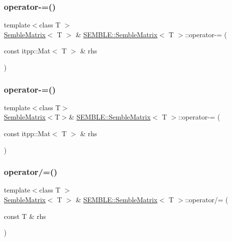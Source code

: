 \subsubsection{\texorpdfstring{operator-\/=()}{operator-=()}\hspace{0.1cm}{\footnotesize\ttfamily [3/4]}}
{\footnotesize\ttfamily template$<$class T $>$ \\
\mbox{\hyperlink{structSEMBLE_1_1SembleMatrix}{Semble\+Matrix}}$<$ T $>$ \& \mbox{\hyperlink{structSEMBLE_1_1SembleMatrix}{S\+E\+M\+B\+L\+E\+::\+Semble\+Matrix}}$<$ T $>$\+::operator-\/= (\begin{DoxyParamCaption}\item[{const itpp\+::\+Mat$<$ T $>$ \&}]{rhs }\end{DoxyParamCaption})}

\mbox{\label{structSEMBLE_1_1SembleMatrix_a51fc6327be31b88c5478f4a4418aaa92}} 
\subsubsection{\texorpdfstring{operator-\/=()}{operator-=()}\hspace{0.1cm}{\footnotesize\ttfamily [4/4]}}
{\footnotesize\ttfamily template$<$class T$>$ \\
\mbox{\hyperlink{structSEMBLE_1_1SembleMatrix}{Semble\+Matrix}}$<$T$>$\& \mbox{\hyperlink{structSEMBLE_1_1SembleMatrix}{S\+E\+M\+B\+L\+E\+::\+Semble\+Matrix}}$<$ T $>$\+::operator-\/= (\begin{DoxyParamCaption}\item[{const itpp\+::\+Mat$<$ T $>$ \&}]{rhs }\end{DoxyParamCaption})}

\mbox{\label{structSEMBLE_1_1SembleMatrix_a372ea71e90cececd03d22b6ac2076ff5}} 
\subsubsection{\texorpdfstring{operator/=()}{operator/=()}\hspace{0.1cm}{\footnotesize\ttfamily [1/6]}}
{\footnotesize\ttfamily template$<$class T $>$ \\
\mbox{\hyperlink{structSEMBLE_1_1SembleMatrix}{Semble\+Matrix}}$<$ T $>$ \& \mbox{\hyperlink{structSEMBLE_1_1SembleMatrix}{S\+E\+M\+B\+L\+E\+::\+Semble\+Matrix}}$<$ T $>$\+::operator/= (\begin{DoxyParamCaption}\item[{const T \&}]{rhs }\end{DoxyParamCaption})}

